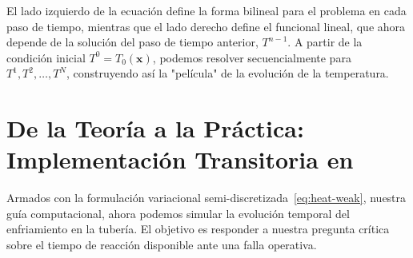 \begin{center}
\end{center}
\bigskip

El lado izquierdo de la ecuación define la forma bilineal para el problema en cada paso de tiempo, mientras que el lado derecho define el funcional lineal, que ahora depende de la solución del paso de tiempo anterior, \(T^{n-1}\). A partir de la condición inicial \(T^0 = T_0(\bm{x})\), podemos resolver secuencialmente para \(T^1, T^2, \dots, T^N\), construyendo así la "película" de la evolución de la temperatura.

\section{De la Teoría a la Práctica: Implementación Transitoria en \fenics}
\label{sec:heat-fenics}
Armados con la formulación variacional semi-discretizada~\eqref{eq:heat-weak}, nuestra guía computacional, ahora podemos simular la evolución temporal del enfriamiento en la tubería. El objetivo es responder a nuestra pregunta crítica sobre el tiempo de reacción disponible ante una falla operativa.

